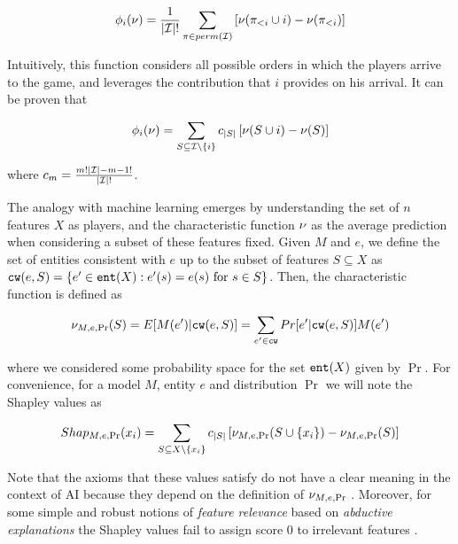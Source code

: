 \begin{align}\label{eq:shapley_values_by_perm}
    \phi_i(\nu) = \frac{1}{|\mathcal{I}|!} \sum_{\pi \in perm(\mathcal{I})} \left[\nu(\pi_{<i} \cup {i}) - \nu(\pi_{<i})\right]
\end{align}

Intuitively, this function considers all possible orders in which the players arrive to the game, and leverages the contribution that $i$ provides on his arrival. It can be proven that

\begin{align*}
    \phi_i(\nu) = \sum_{S \subseteq \mathcal{I} \setminus \{i\}} c_{|S|}\left[\nu(S \cup {i}) - \nu(S)\right]
\end{align*}

where $c_m = \frac{m! |\mathcal{I}|-m-1!}{|\mathcal{I}|!}$.

The analogy with machine learning emerges by understanding the set of $n$ features $X$ as players, and the characteristic function $\nu$ as the average prediction when considering a subset of these features fixed. Given $M$ and $e$, we define the set of entities consistent with $e$ up to the subset of features $S \subseteq X$ as $\texttt{cw}(e, S) = \{e' \in \texttt{ent}(X) : e'(s) = e(s) \text{ for } s \in S\}$. Then, the characteristic function is defined as

\begin{align*}
    \nu_{M,e,\Pr}(S) = E[M(e') | \texttt{cw}(e,S)] = \sum_{e' \in \texttt{cw}} Pr[e' | \texttt{cw}(e,S)] M(e')
\end{align*}

where we considered some probability space for the set $\texttt{ent}(X)$ given by $\Pr$. For convenience, for a model $M$, entity $e$ and distribution $\Pr$ we will note the Shapley values as

\begin{align*}
    Shap_{M,e,\Pr}(x_i) = \sum_{S \subseteq X \setminus \{x_i\}} c_{|S|} \left[ \nu_{M,e,\Pr}(S \cup \{x_i\}) - \nu_{M,e,\Pr}(S) \right]
\end{align*}

Note that the axioms that these values satisfy do not have a clear meaning in the context of AI because they depend on the definition of $\nu_{M,e,\Pr}$ \cite{fryer2021shapley}. Moreover, for some simple and robust notions of \textit{feature relevance} based on \textit{abductive explanations} \cite{marques2023logic} the Shapley values fail to assign score 0 to irrelevant features \cite{huang2023inadequacy}.


